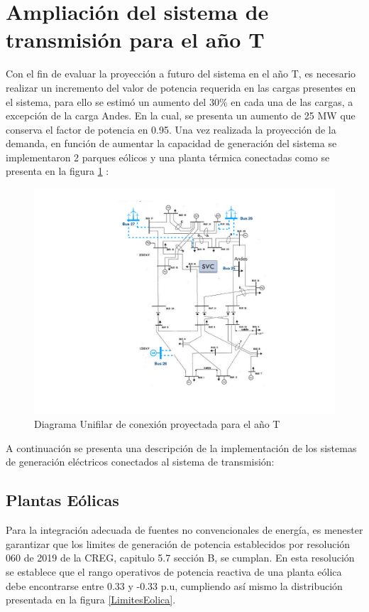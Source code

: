 \documentclass{article}
\begin{document}
\section{Ampliación del sistema de transmisión para el año T}
Con el fin de evaluar la proyección a futuro del sistema en el año T, es necesario realizar un incremento del valor de potencia requerida en las cargas presentes en el sistema, para ello se estimó un aumento del 30\% en cada una de las cargas, a excepción de la carga Andes. En la cual, se presenta un aumento de 25 MW que conserva el factor de potencia en 0.95. Una vez realizada la proyección de la demanda, en función de aumentar la capacidad de generación del sistema se implementaron 2 parques eólicos y una planta térmica conectadas como se presenta en la figura \ref{UnifilarAnoT} :

\begin{figure}[H]
    \centering
    \includegraphics[scale=0.7]{UnifilarDragon.pdf}
    \caption{Diagrama Unifilar de conexión proyectada para el año T}
    \label{UnifilarAnoT}
\end{figure}
A continuación se presenta una descripción de la implementación de los sistemas de generación eléctricos conectados al sistema de transmisión:
\subsection{Plantas Eólicas}
Para la integración adecuada de fuentes no convencionales de energía, es menester garantizar que los limites de generación de potencia establecidos por resolución 060 de 2019 de la CREG, capitulo 5.7 sección B, se cumplan. En esta resolución se establece que el rango operativos de potencia reactiva de una planta eólica debe encontrarse entre 0.33 y -0.33 p.u, cumpliendo así mismo la distribución presentada en la figura \ref{LimitesEolica}.
\end{document}
